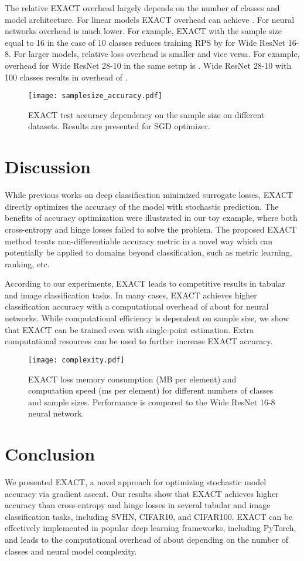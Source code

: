 \documentclass[nohyperref]{article}
\theoremstyle{plain}
\theoremstyle{definition}
\theoremstyle{remark}
\begin{document}
The relative EXACT overhead largely depends on the number of classes and model architecture. For linear models EXACT overhead can achieve . For neural networks overhead is much lower. For example, EXACT with the sample size equal to 16 in the case of 10 classes reduces training RPS by  for Wide ResNet 16-8. For larger models, relative loss overhead is smaller and vice versa. For example, overhead for Wide ResNet 28-10 in the same setup is . Wide ResNet 28-10 with 100 classes results in overhead of .
\begin{figure}[t]
\vskip 0.2in
\centering
\texttt{[image: samplesize\_accuracy.pdf]}
\caption{EXACT test accuracy dependency on the sample size on different datasets. Results are presented for SGD optimizer.}
\label{fig:samplesize}
\vskip -0.2in
\end{figure}
\section{Discussion}
While previous works on deep classification minimized surrogate losses, EXACT directly optimizes the accuracy of the model with stochastic prediction.
The benefits of accuracy optimization were illustrated in our toy example, where both cross-entropy and hinge losses failed to solve the problem.
The proposed EXACT method treats non-differentiable accuracy metric in a novel way which can potentially be applied to domains beyond classification, such as metric learning, ranking, etc.

According to our experiments, EXACT leads to competitive results in tabular and image classification tasks. In many cases, EXACT achieves higher classification accuracy with a computational overhead of about  for neural networks. While computational efficiency is dependent on sample size, we show that EXACT can be trained even with single-point estimation. Extra computational resources can be used to further increase EXACT accuracy.
\begin{figure}[t]
\vskip 0.2in
\centering
\texttt{[image: complexity.pdf]}
\caption{EXACT loss memory consumption (MB per element) and computation speed (ms per element) for different numbers of classes and sample sizes. Performance is compared to the Wide ResNet 16-8 neural network.}
\label{fig:timememory}
\vskip -0.2in
\end{figure}
\section{Conclusion}
We presented EXACT, a novel approach for optimizing stochastic model accuracy via gradient ascent. Our results show that EXACT achieves higher accuracy than cross-entropy and hinge losses in several tabular and image classification tasks, including SVHN, CIFAR10, and CIFAR100. EXACT can be effectively implemented in popular deep learning frameworks, including PyTorch, and leads to the computational overhead of about  depending on the number of classes and neural model complexity.
\end{document}
